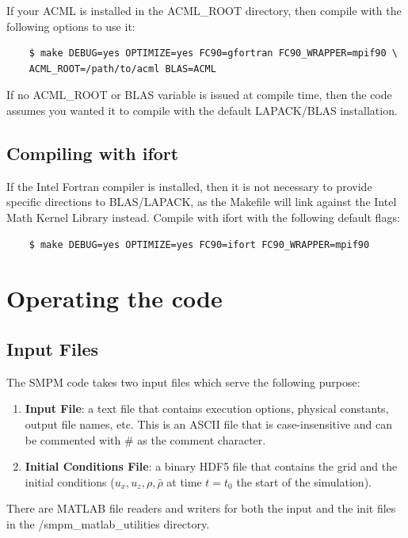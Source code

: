 \documentclass[onside]{article}
\begin{document}
If your ACML is installed in the ACML\_ROOT directory, then compile with the following options to use it:
\begin{verbatim}
	$ make DEBUG=yes OPTIMIZE=yes FC90=gfortran FC90_WRAPPER=mpif90 \
	ACML_ROOT=/path/to/acml BLAS=ACML
\end{verbatim}

If no ACML\_ROOT or BLAS variable is issued at compile time, then the code assumes you wanted it to compile with the default LAPACK/BLAS installation.  

\subsection{Compiling with ifort}

If the Intel Fortran compiler is installed, then it is not necessary to provide specific directions to BLAS/LAPACK, as the Makefile will link against the Intel Math Kernel Library instead.  Compile with ifort with the following default flags:

\begin{verbatim}
	$ make DEBUG=yes OPTIMIZE=yes FC90=ifort FC90_WRAPPER=mpif90 
\end{verbatim}

\section{Operating the code}

\subsection{Input Files}

The SMPM code takes two input files which serve the following purpose:
\begin{enumerate}
	\item \textbf{Input File}: a text file that contains execution options, physical constants, output file names, etc.  This is an ASCII file that is case-insensitive and can be commented with \# as the comment character.
	\item \textbf{Initial Conditions File}: a binary HDF5 file that contains the grid and the initial conditions ($u_x, u_z, \rho, \bar{\rho}$ at time $t = t_0$ the start of the simulation).
\end{enumerate}

There are MATLAB file readers and writers for both the input and the init files in the /smpm\_matlab\_utilities directory.
\end{document}
